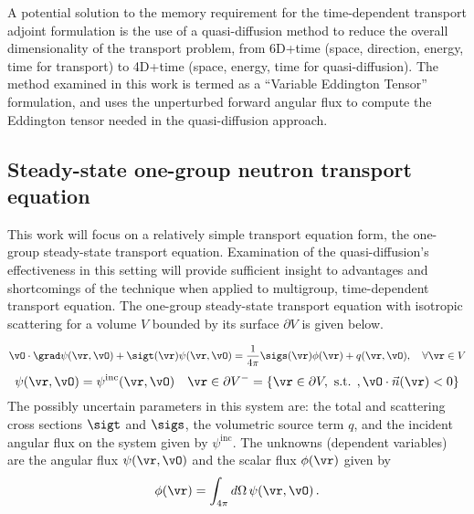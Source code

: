 A potential solution to the memory requirement for the time-dependent transport adjoint formulation is the use of a quasi-diffusion method to reduce the overall dimensionality of the transport problem, from 6D+time (space, direction, energy, time for transport) to 4D+time (space, energy, time for quasi-diffusion). The method examined in this work is termed  as a ``Variable Eddington Tensor'' formulation, and uses the unperturbed forward angular flux to compute the Eddington tensor needed in the quasi-diffusion approach.


\subsection{Steady-state one-group neutron transport equation}

This work will focus on a relatively simple transport equation form, the one-group steady-state transport equation. Examination of the quasi-diffusion's effectiveness in this setting will provide sufficient insight to advantages and shortcomings of the technique when applied to multigroup, time-dependent transport equation. The one-group steady-state transport equation with isotropic scattering for a volume $V$ bounded by its surface $\partial V$ is given below.

\begin{equation}
\label{SS1GTE}
\vO \cdot \grad \psi(\vr,\vO) + \sigt(\vr) \psi(\vr,\vO) = \frac{1}{4 \pi} \sigs(\vr) \phi(\vr) + q(\vr,\vO), \quad \forall \vr \in V
\end{equation}
\begin{equation}
\label{SS1GTE_bc}
\psi(\vr,\vO) = \psi^{\text{inc}}(\vr,\vO) \quad \vr \in \partial V^{-} = \{ \vr \in \partial V, \text{ s.t. }, \vO \cdot \vec{n}(\vr) < 0\}
\end{equation}
The possibly uncertain parameters in this system are: the total and scattering cross sections $\sigt$ and $\sigs$, the volumetric source term $q$, and the incident angular flux on the system given by $\psi^{\text{inc}}$. The unknowns (dependent variables) are the angular flux $\psi(\vr,\vO)$ and the scalar flux $\phi(\vr)$ given by
\[
\phi(\vr) = \int_{4\pi}d\Omega\,\psi(\vr,\vO) \,.
\]

